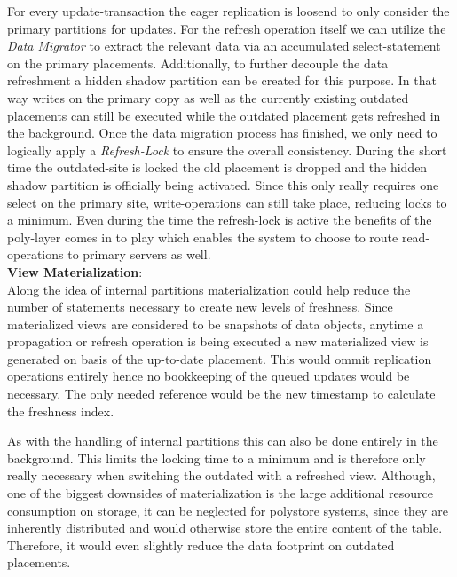 For every update-transaction the eager replication is loosend to only consider the primary partitions for updates.
For the refresh operation itself we can utilize the \emph{Data Migrator} to extract the relevant data via an accumulated select-statement on the primary placements.
Additionally, to further decouple the data refreshment a hidden shadow partition can be created for this purpose. In that way writes on the primary copy as well as the 
currently existing outdated placements can still be executed while the outdated placement gets refreshed in the background. Once the data migration process has finished, 
we only need to logically apply a \emph{Refresh-Lock} to ensure the overall consistency. During the short time the outdated-site is locked the old placement is dropped and 
the hidden shadow partition is officially being activated. Since this only really requires one select on the primary site, write-operations can still take place, reducing
locks to a minimum. Even during the time the refresh-lock is active the benefits of the poly-layer comes in to play which enables the system to choose to 
route read-operations to primary servers as well.\\


\textbf{View Materialization}:\\
Along the idea of internal partitions materialization could help reduce the number of statements necessary to create new levels of freshness.
Since materialized views are considered to be snapshots of data objects, anytime a propagation or refresh operation is being executed a new materialized view is 
generated on basis of the up-to-date placement.
This would ommit replication operations entirely hence no bookkeeping of the queued updates would be necessary. The only needed reference would be the new timestamp
to calculate the freshness index.

As with the handling of internal partitions this can also be done entirely in the background. This limits the locking time to a minimum and is therefore only really 
necessary when switching the outdated with a refreshed view.
Although, one of the biggest downsides of materialization is the large additional resource consumption on storage, it can be neglected for polystore systems, since they are
inherently distributed and would otherwise store the entire content of the table. Therefore, it would even slightly reduce the data footprint on outdated placements.







